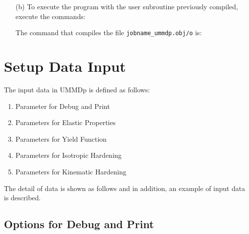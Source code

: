 \documentclass[11pt,a4paper,twoside,final,onecolumn,titlepage]{article}
\begin{document}
\begin{enumerate}
\item[(b)] To execute the program with the user subroutine previously compiled, execute the commands:\\
	\par
	\texttt{}	
	\par\bigskip
	\par
	\texttt{}	
	\par\bigskip
\item[] The command that compiles the file \texttt{jobname\_ummdp.obj/o} is:\\
	\par
	\texttt{}	
	\par\bigskip
\end{enumerate}
	
	
\newpage
\section{Setup Data Input}

The input data in UMMDp is defined as follows:

\begin{enumerate}
	\item Parameter for Debug and Print
	\item	Parameters for Elastic Properties
	\item Parameters for Yield Function
	\item Parameters for Isotropic Hardening
	\item Parameters for Kinematic Hardening
\end{enumerate}

\noindent The detail of data is shown as follows and in addition, an example of input data is described.

\subsection{Options for Debug and Print}
\end{document}
